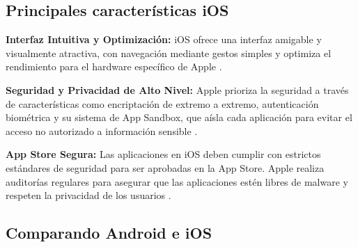 \subsection{Principales características iOS}


    \begin{list}{}%
        {\setlength{\leftmargin}{1cm}%
         \setlength{\rightmargin}{1cm}%
         \setlength{\itemsep}{0.5\baselineskip}%
         \setlength{\parsep}{0pt}}
         
        \item\relax
        \small
        \textbf{Interfaz Intuitiva y Optimización:} iOS ofrece una interfaz amigable y visualmente atractiva, con navegación mediante gestos simples y optimiza el rendimiento para el hardware específico de Apple \cite{CitaD6}.
 
        
        \item\relax
        \small
        \textbf{Seguridad y Privacidad de Alto Nivel:} Apple prioriza la seguridad a través de características como encriptación de extremo a extremo, autenticación biométrica y su sistema de App Sandbox, que aísla cada aplicación para evitar el acceso no autorizado a información sensible \cite{CitaD6}.

        
        \item\relax
        \small
        \textbf{App Store Segura:} Las aplicaciones en iOS deben cumplir con estrictos estándares de seguridad para ser aprobadas en la App Store. Apple realiza auditorías regulares para asegurar que las aplicaciones estén libres de malware y respeten la privacidad de los usuarios \cite{CitaD6}.
        
        \end{list}

\subsection{Comparando Android e iOS}


